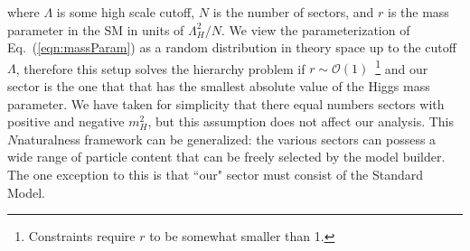 \documentclass[nofootinbib,twocolumn,preprintnumbers]{revtex4-1}
\begin{document}
where $\Lambda$ is some high scale cutoff, $N$ is the number of sectors, and $r$ is the mass parameter in the SM in units of $\Lambda_H^2/N$. We view the parameterization of Eq.~(\ref{eqn:massParam}) as a random distribution in theory space up to the cutoff $\Lambda$, therefore this setup solves the hierarchy problem if $r \sim \mathcal{O}(1)$~\cite{Arkani-Hamed:2016rle}\footnote{Constraints require $r$ to be somewhat smaller than 1.} and our sector is the one that that has the smallest absolute value of the Higgs mass parameter. We have taken for simplicity that there equal numbers sectors with positive and negative $m_H^2$, but this assumption does not affect our analysis. This $N$naturalness framework can be generalized: the various sectors can possess a wide range of particle content that can be freely selected by the model builder. The one exception to this is that ``our" sector must consist of the Standard Model.
\end{document}
